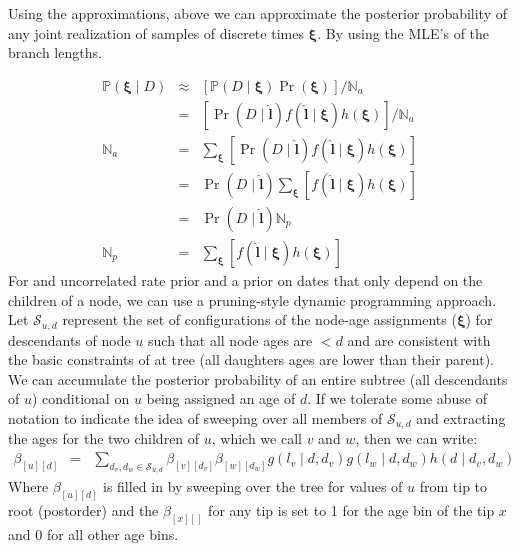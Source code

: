 \documentclass{llncs}
\newcommand{\dataMatrix}[0]{\ensuremath{D}\xspace}
\newcommand{\edgeLen}[1]{\ensuremath{l_{#1}}\xspace}
\newcommand{\edgeLenVec}[0]{\ensuremath{\bm{l}}\xspace}
\newcommand{\timeBinRealizationVec}[0]{\ensuremath{\bm{\xi}}\xspace}
\newcommand{\subtreeAgeSum}[2]{\ensuremath{\beta_{[{#1}][{#2}]}}\xspace}
\newcommand{\ratePriorDensity}[0]{\ensuremath{g}\xspace}
\newcommand{\timePriorDensity}[0]{\ensuremath{h}\xspace}
\newcommand{\ImpPr}[0]{\ensuremath{\mathbb{P}}\xspace}
\newcommand{\norm}[0]{\ensuremath{\mathbb{N}}\xspace}
\newcommand{\subtreeConst}[2]{\mathcal{S}_{#1,#2}}
\begin{document}
Using the approximations, above we can approximate the posterior probability of any
    joint realization of samples of discrete times $\timeBinRealizationVec$.
By using the MLE's of the branch lengths.

\begin{eqnarray}
    \ImpPr(\timeBinRealizationVec \mid \dataMatrix) & \approx &\left[\ImpPr(D\mid \timeBinRealizationVec)\Pr(\timeBinRealizationVec) \right]/\norm_a\\
    & = & \left[\Pr(D \mid \hat{\edgeLenVec})f(\hat{\edgeLenVec} \mid \timeBinRealizationVec)\timePriorDensity(\timeBinRealizationVec) \right]/\norm_a\\
    \norm_a & = & \sum_{\timeBinRealizationVec} \left[\Pr(D \mid \hat{\edgeLenVec})f(\hat{\edgeLenVec} \mid \timeBinRealizationVec)\timePriorDensity(\timeBinRealizationVec)\right] \\
    & = & \Pr(D \mid \hat{\edgeLenVec})\sum_{\timeBinRealizationVec} \left[f(\hat{\edgeLenVec} \mid \timeBinRealizationVec)\timePriorDensity(\timeBinRealizationVec)\right] \\
        & = & \Pr(D \mid \hat{\edgeLenVec})\norm_p \\
    \norm_p & = & \sum_{\timeBinRealizationVec} \left[f(\hat{\edgeLenVec} \mid \timeBinRealizationVec)\timePriorDensity(\timeBinRealizationVec)\right]
\end{eqnarray}
For and uncorrelated rate prior and a prior on dates that only depend on the children of a node, we can
    use a pruning-style dynamic programming approach.
Let $\subtreeConst{u}{d}$ represent the set of configurations of the node-age assignments ($\timeBinRealizationVec$)
    for descendants of node $u$ such that all node ages are $<d$ and are consistent
    with the basic constraints of at tree (all daughters ages are lower than their parent).
We can accumulate the posterior probability of an entire subtree (all descendants of $u$)
    conditional on $u$ being assigned an age of $d$.
If we tolerate some abuse of notation to indicate the idea of 
    sweeping over all members of $\subtreeConst{u}{d}$ and extracting the
    ages for the two children of $u$, which we call $v$ and $w$, then
    we can write:
\begin{eqnarray}
\subtreeAgeSum{u}{d} & = & \sum_{d_v,d_w \in \subtreeConst{u}{d}}
    \subtreeAgeSum{v}{d_v} \subtreeAgeSum{w}{d_w}
    \ratePriorDensity(\edgeLen{v} \mid d, d_v)\ratePriorDensity(\edgeLen{w} \mid d, d_w)
    \timePriorDensity(d \mid d_v, d_w)
\end{eqnarray}
Where $\subtreeAgeSum{u}{d}$ is filled in by sweeping over the tree for values of $u$ from tip to root (postorder) and the $\subtreeAgeSum{x}{}$ for any tip is set to 1 for the age bin of the tip $x$ and 0 for all other age bins.
\end{document}
